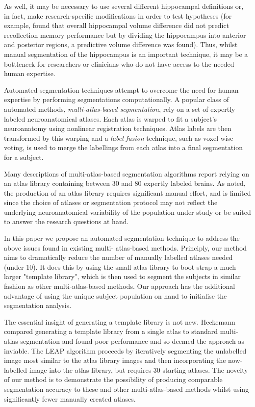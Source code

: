 \documentclass{article}\usepackage{graphicx, color}
\begin{document}
As well, it may be necessary to use several different hippocampal
definitions or, in fact, make research-specific modifications in order to test
hypotheses (for example, \cite{Poppenk2011} found that overall hippocampal
volume difference did not predict recollection memory performance but by
dividing the hippocampus into anterior and posterior regions, a predictive
volume difference was found).  Thus, whilst manual segmentation of the
hippocampus is an important technique, it may be a bottleneck for researchers
or clinicians who do not have access to the needed human expertise.

Automated segmentation techniques attempt to overcome the need for human
expertise by performing segmentations computationally.  A popular class of
automated methods, {\it multi-atlas-based segmentation}, rely on a set of
expertly labeled neuroanatomical atlases. Each atlas is warped to fit a
subject's neuroanatomy using nonlinear registration
techniques\cite{Collins1995,Klein2009}.  Atlas labels are then transformed
by this warping and a {\it label fusion} technique, such as voxel-wise
voting, is used to merge the labellings from each atlas into a final
segmentation for a subject.  

Many descriptions of multi-atlas-based segmentation algorithms report relying on an
atlas library containing between 30 and 80 expertly labeled
brains\cite{Heckemann2011,Collins2010,Aljabar2009,Leung2010,Lotjonen2010}.
As noted, the production of an atlas library requires significant manual
effort, and is limited since the choice of atlases or segmentation protocol may
not reflect the underlying neuroanatomical variability of the population under
study or be suited to answer the research questions at hand.

In this paper we propose an automated segmentation technique to address the
above issues found in existing multi- atlas-based methods. Principly, our
method aims to dramatically reduce the number of manually labelled atlases
needed (under 10). It does this by using the small atlas library to boot-strap
a much larger "template library", which is then used to segment the subjects in
similar fashion as other multi-atlas-based methods. Our approach has the
additional advantage of using the unique subject population on hand to
initialise the segmentation analysis.

The essential insight of generating a template library is not new.  Heckemann
\cite{Heckemann2006} compared generating a template library from a single atlas
to standard multi-atlas segmentation and found poor performance and so deemed
the approach as inviable.  The LEAP algorithm \cite{Wolz2010} proceeds by
iteratively segmenting the unlabelled image most similar to the atlas library
images and then incorporating the now-labelled image into the atlas library,
but requires 30 starting atlases.  The novelty of our method is to demonstrate
the possibility of producing comparable segmentation accuracy to these and
other multi-atlas-based methods whilst using significantly fewer manually
created atlases.
\end{document}

